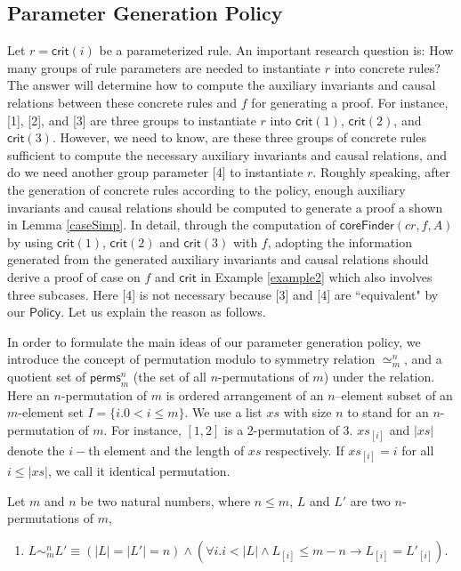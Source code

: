 \documentclass[conference]{IEEEtran}
\begin{document}
{\subsection{Parameter Generation Policy}\label{sec:parameterGenPolicy}
\vspace{-5pt}
Let $r=\mathsf{crit}(i)$ be a parameterized rule. An important research question is: How many groups of rule parameters  are needed to instantiate $r$ into concrete rules? The answer will determine how to compute the auxiliary invariants and causal relations between these concrete rules and $f$ for generating a proof.
For instance, [1], [2], and [3] are three groups to instantiate $r$ into $\mathsf{crit}(1)$, $\mathsf{crit}(2)$, and $\mathsf{crit}(3)$. However, we need to know, are these three groups of concrete rules sufficient to compute the necessary auxiliary invariants and causal relations, and do we need another group parameter [4] to instantiate $r$. Roughly speaking, after the generation of concrete rules according to the policy, enough auxiliary invariants and causal relations should be computed to generate  a proof a shown in Lemma \ref{caseSimp}. In detail, through the computation of $\mathsf{coreFinder}(cr,  f, A)$ by using $\mathsf{crit}(1)$, $\mathsf{crit}(2)$ and $\mathsf{crit}(3)$ with $f$, adopting the information generated from the generated auxiliary invariants and causal relations should derive a proof of case on $f$ and $\mathsf{crit}$ in Example \ref{example2} which also involves three subcases. Here [4] is not necessary because [3] and [4] are ``equivalent" by our $\mathsf{Policy}$. Let us explain the reason as follows.

In order to formulate the main ideas of our parameter generation policy, we introduce the concept of permutation modulo to symmetry relation $\simeq_m^n$,  and a quotient set of $\mathsf{perms}_{m}^{n}$ (the set of all $n$-permutations of $m$) under the  relation.  Here an $n$-permutation of $m$ is ordered arrangement of  an $n$--element subset of an $m$-element set $I=\{i. 0<i\le m\}$. We use a list $xs$ with size $n$ to stand for an $n$-permutation of $m$. For instance, $[1,2]$ is a 2-permutation of 3. $xs_{[i]}$ and $|xs|$  denote  the $i-$th element and the length of $xs$ respectively. If $xs_{[i]}=i$ for all $i \le |xs|$, we call it identical permutation. %
\vspace{-10pt}
\begin{definition}
Let $m$ and $n$ be two natural numbers, where $n \le m$,  $L$ and $L'$ are  two  $n$-permutations of $m$,
\begin{enumerate}[leftmargin=14pt,noitemsep,nolistsep]
\item
$L \sim_m^n L' \equiv (|L| =|L'|=n) \wedge (\forall i. i<|L| \wedge L_{[i]} \le m-n \longrightarrow L_{[i]}=L'_{[i]}) $.


\end{enumerate}
\end{definition}}
\end{document}
